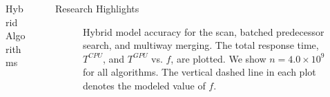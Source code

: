 \documentclass[final]{beamer}
\newlength{\sepwidth}
\newlength{\colwidth}
\newcommand{\separatorcolumn}{\begin{column}{\sepwidth}\end{column}}
\begin{document}
\begin{frame}[t]
\begin{columns}[t]
\begin{column}{\colwidth}
\begin{block}{Hybrid Algorithms}
  \end{block}

\end{column}

\separatorcolumn

\begin{column}{\colwidth}

  \begin{block}{Research Highlights}
\begin{figure}[htp]
\centering
{}

 \caption{Hybrid model accuracy for the scan, batched predecessor search, and multiway merging. The total response time, $T^{CPU}$, and $T^{GPU}$ vs. $f$, are plotted. We show $n=4.0\times10^9$ for all algorithms. The vertical dashed line in each plot denotes the modeled value of $f$.}

 \label{fig:time_vs_f}
\end{figure}


\end{block}
\end{column}
\end{columns}
\end{frame}
\end{document}
